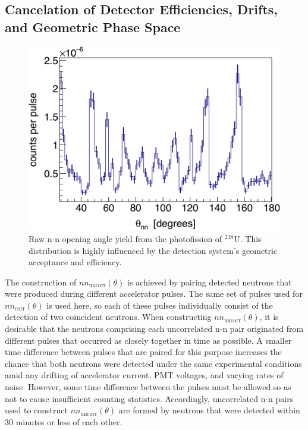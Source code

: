 \subsection{Cancelation of Detector Efficiencies, Drifts, and Geometric Phase Space}
\label{subsec:SPDPCancelation}
\begin{figure}[h]
\includegraphics[width=\figsize\textwidth]{./DetAcceptance.png}
\caption{Raw n-n opening angle yield from the photofission of $^{238}$U. 
This distribution is highly influenced by the detection system's geometric acceptance and efficiency.
}
\label{fig:DetAcceptance}
\end{figure}

The construction of $nn_{\text{uncorr}}(\theta)$ is achieved by pairing detected neutrons that were produced during different accelerator pulses.
The same set of pulses used for $nn_{\text{corr}}(\theta)$ is used here, so each of these pulses individually consist of the detection of two coincident neutrons.
When constructing $nn_{\text{uncorr}}(\theta)$, it is desirable that the neutrons comprising each uncorrelated n-n pair originated from different pulses that occurred as closely together in time as possible.
A smaller time difference between pulses that are paired for this purpose increases the chance that both neutrons were detected under the same experimental conditions amid any drifting of accelerator current, PMT voltages, and varying rates of noise.
However, some time difference between the pulses must be allowed so as not to cause insufficient counting statistics.
Accordingly, uncorrelated n-n pairs used to construct $nn_{\text{uncorr}}(\theta)$ are formed by neutrons that were detected within 30 minutes or less of each other.

